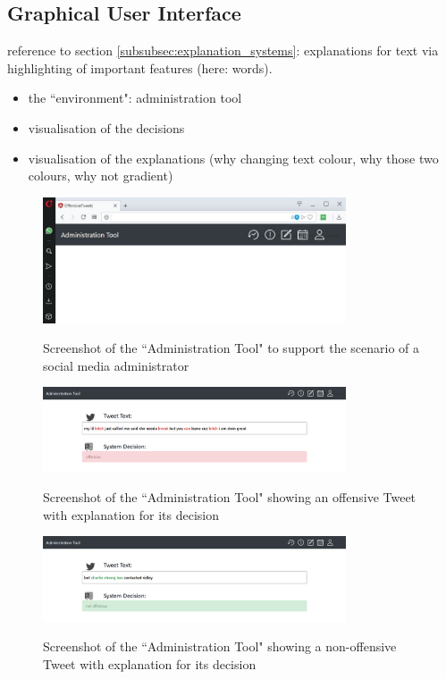 {\color{blue}
\subsection{Graphical User Interface}
reference to section \ref{subsubsec:explanation_systems}: explanations for text via highlighting of important features (here: words).
\begin{itemize}
	\item the ``environment": administration tool
	\item visualisation of the decisions
	\item visualisation of the explanations (why changing text colour, why those two colours, why not gradient)
\end{itemize}

\begin{figure} [H]
	\centering
	\includegraphics[width=0.8\textwidth]{img/administrationTool.JPG}\\
	\caption{Screenshot of the ``Administration Tool" to support the scenario of a social media administrator}
	\label{fig:admin_tool}
\end{figure}
\begin{figure} [H]
	\centering
	\includegraphics[width=0.8\textwidth]{img/pg_2_12.PNG}\\
	\caption{Screenshot of the ``Administration Tool" showing an offensive Tweet with explanation for its decision}
	\label{fig:admin_tool_offensive}
\end{figure}
\begin{figure} [H]
	\centering
	\includegraphics[width=0.8\textwidth]{img/pg_2_0.PNG}\\
	\caption{Screenshot of the ``Administration Tool" showing a non-offensive Tweet with explanation for its decision}
	\label{fig:admin_tool_not_offensive}
\end{figure}
}


